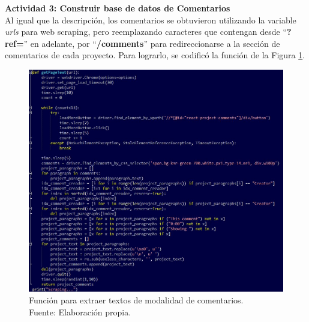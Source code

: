 \textbf{Actividad 3: Construir base de datos de Comentarios}
\\
Al igual que la descripción, los comentarios se obtuvieron utilizando la variable \textit{urls} para web scraping, pero reemplazando caracteres que contengan desde “\textbf{?ref=}” en adelante, por “\textbf{/comments}” para redireccionarse a la sección de comentarios de cada proyecto. Para lograrlo, se codificó la función de la Figura \ref{4:fig8}.

\begin{figure}[!ht]
	\begin{center}
		\includegraphics[width=1\textwidth]{4/figures/comments_scraping.jpg}
		\caption[Función para extraer textos de modalidad de comentarios]{Función para extraer textos de modalidad de comentarios.\\
			Fuente: Elaboración propia.}
		\label{4:fig8}
	\end{center}
\end{figure}

